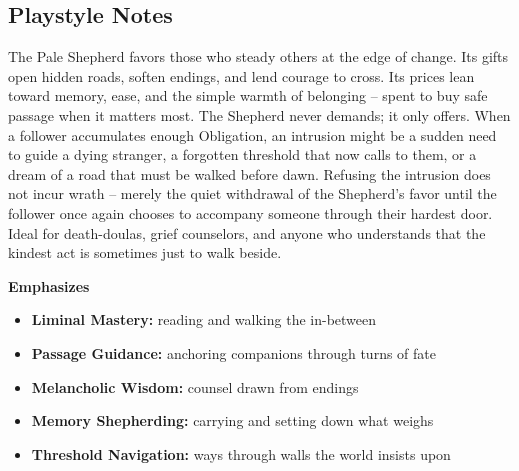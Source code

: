 \subsection*{Playstyle Notes}
The Pale Shepherd favors those who steady others at the edge of change. Its gifts open hidden roads, soften endings, and lend courage to cross. Its prices lean toward memory, ease, and the simple warmth of belonging -- spent to buy safe passage when it matters most. The Shepherd never demands; it only offers. When a follower accumulates enough Obligation, an intrusion might be a sudden need to guide a dying stranger, a forgotten threshold that now calls to them, or a dream of a road that must be walked before dawn. Refusing the intrusion does not incur wrath -- merely the quiet withdrawal of the Shepherd's favor until the follower once again chooses to accompany someone through their hardest door. Ideal for death-doulas, grief counselors, and anyone who understands that the kindest act is sometimes just to walk beside.

\noindent\textbf{Emphasizes}
\begin{itemize}
  \item \textbf{Liminal Mastery:} reading and walking the in-between
  \item \textbf{Passage Guidance:} anchoring companions through turns of fate
  \item \textbf{Melancholic Wisdom:} counsel drawn from endings
  \item \textbf{Memory Shepherding:} carrying and setting down what weighs
  \item \textbf{Threshold Navigation:} ways through walls the world insists upon
\end{itemize}

